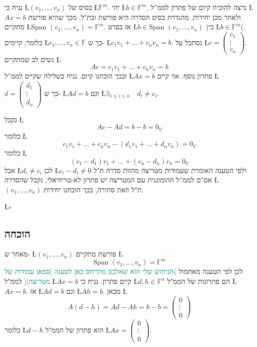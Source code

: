 \documentclass[english,hebrew]{article}
\newcommand{\spn}{\text{Span }}
\begin{document}
נניח כי \L{$(v_{1},\dots,v_{n})$} בסיס של \L{$\mathbb{F}^{m}$}.
יהי \L{$b\in\mathbb{F}^{m}$}. נרצה להוכיח קיום של פתרון לממ\textquotedblright ל
\L{$Ax=b$} ולאחר מכן יחידות. מהגדרת בסיס הסדרה היא פורשת ובת"ל.
מכך שהיא פורשת מתקיים \L{$\spn(v_{1},\dots,v_{n})=\mathbb{F}^{m}$}.
אז בפרט \L{$b\in\spn(v_{1},\dots,v_{n})$} )כי \L{$b\in\mathbb{F}^{m}$}(.
כלומר, קיימים \L{$c_{1},\dots,c_{n}\in\mathbb{F}$} כך ש- \L{$c_{1}v_{1}+\dots+c_{n}v_{n}=b$}.
נסתכל על \L{$c=\begin{pmatrix}c_{1}\\
\vdots\\
c_{n}
\end{pmatrix}$}. נשים לב שמתקיים \L{%
\[
Ac=c_{1}v_{1}+\dots+c_{n}v_{n}=b
\]
}%
ובכך הוכחנו קיום. נניח בשלילה שקיים לממ\textquotedblright ל \L{$Ax=b$}
פתרון נוסף. אזי קיים \L{$d=\begin{pmatrix}d_{1}\\
\vdots\\
d_{n}
\end{pmatrix}$} כך ש- \L{$Ad=b$} וגם \L{$\exists_{1\le i\le n}\quad d_{i}\neq c_{i}$}.

נקבל \L{%
\[
Ac-Ad=b-b=0_{V}
\]
}%
כלומר \L{%
\[
c_{1}v_{1}+\dots+c_{n}v_{n}-(d_{1}v_{1}+\dots+d_{n}v_{n})=0_{V}
\]
}%
 כלומר \L{%
\[
(c_{1}-d_{1})v_{1}+\dots+(c_{n}-d_{n})v_{n}=0_{V}
\]
}%
 אבל \L{$d_{i}\neq c_{i}$} לכן \L{$c_{i}-d_{i}\neq0$} ולפי הטענה
האומרת שעמודות מטריצה מהוות סדרה ת"ל אם"ם לממ\textquotedblright ל
ההומוגנית עם המטריצה יש פתרון לא-טריוויאלי, נקבל שהסדרה \L{$(v_{1},\dots,v_{n})$}
ת"ל וזאת סתירה, בכך הוכחנו יחידות.
\begin{flushright}
\L{$\square$}
\par\end{flushright}

\subsection{הוכחה}

מאחר ש- \L{$(v_{1},\dots,v_{n})$} פורשת מתקיים \L{%
\[
\spn(v_{1},\dots,v_{n})=\mathbb{F}^{m}
\]
}%
לכן לפי הטענה מאתמול \textcolor{teal}{)הניחוש שלי הוא שאלכס מתייחס
כאן לטענה {]}ספאן עמודות של מטריצה{[}(} לממ"ל \L{$Ax=b$} קיים פתרון.
נניח כי \L{$d,h\in\mathbb{F}^{n}$} הם פתרונות של הממ"ל \L{$Ax=b$}.
אז \L{$Ad=b$} וגם \L{$Ah=b$}. מכאן \L{%
\[
A(d-h)=Ad-Ah=b-b=\begin{pmatrix}0\\
\vdots\\
0
\end{pmatrix}
\]
}%
כלומר \L{$d-h$} הוא פתרון של הממ"ל \L{$Ax=\begin{pmatrix}0\\
\vdots\\
0
\end{pmatrix}$}.
\end{document}
